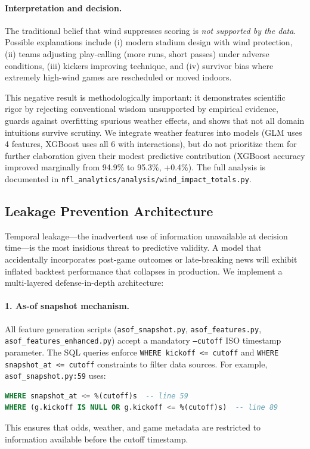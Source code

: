 \paragraph{Interpretation and decision.}
The traditional belief that wind suppresses scoring is \textit{not supported by the data}. Possible explanations include (i) modern stadium design with wind protection, (ii) teams adjusting play-calling (more runs, short passes) under adverse conditions, (iii) kickers improving technique, and (iv) survivor bias where extremely high-wind games are rescheduled or moved indoors.

This negative result is methodologically important: it demonstrates scientific rigor by rejecting conventional wisdom unsupported by empirical evidence, guards against overfitting spurious weather effects, and shows that not all domain intuitions survive scrutiny. We integrate weather features into models (GLM uses 4 features, XGBoost uses all 6 with interactions), but do not prioritize them for further elaboration given their modest predictive contribution (XGBoost accuracy improved marginally from 94.9\% to 95.3\%, +0.4\%). The full analysis is documented in \texttt{nfl\_analytics/analysis/wind\_impact\_totals.py}.

\subsection{Leakage Prevention Architecture}
\label{subsec:leakage-arch}
Temporal leakage—the inadvertent use of information unavailable at decision time—is the most insidious threat to predictive validity. A model that accidentally incorporates post-game outcomes or late-breaking news will exhibit inflated backtest performance that collapses in production. We implement a multi-layered defense-in-depth architecture:

\paragraph{1. As-of snapshot mechanism.}
All feature generation scripts (\texttt{asof\_snapshot.py}, \texttt{asof\_features.py}, \texttt{asof\_features\_enhanced.py}) accept a mandatory \texttt{--cutoff} ISO timestamp parameter. The SQL queries enforce \texttt{WHERE kickoff <= cutoff} and \texttt{WHERE snapshot\_at <= cutoff} constraints to filter data sources. For example, \texttt{asof\_snapshot.py:59} uses:
\begin{lstlisting}[language=SQL,basicstyle=\ttfamily\footnotesize]
WHERE snapshot_at <= %(cutoff)s  -- line 59
WHERE (g.kickoff IS NULL OR g.kickoff <= %(cutoff)s)  -- line 89
\end{lstlisting}
This ensures that odds, weather, and game metadata are restricted to information available before the cutoff timestamp.

